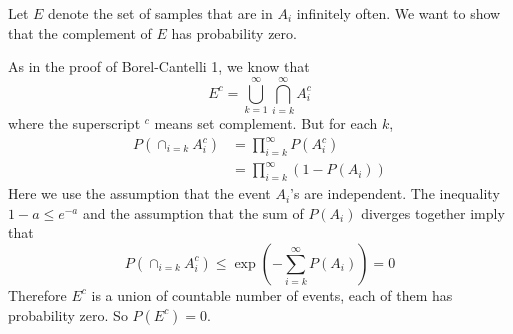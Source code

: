\documentclass[12pt]{article}
\begin{document}
Let $E$ denote the set of samples that are in $A_i$ infinitely often. We want to show that the complement of $E$ has probability zero.

As in the proof of Borel-Cantelli 1, we know that
\[
 E^c = \bigcup_{k=1}^\infty \bigcap_{i=k}^\infty A_i^c
\]
where the superscript $^c$ means set complement. But for each $k$,
\begin{align*}
P(\cap_{i=k} A_i^c) &= \prod_{i=k}^\infty P(A_i^c) \\
&= \prod_{i=k}^\infty (1-P(A_i))
\end{align*}
Here we use the assumption that the event $A_i$'s are independent. The inequality $1-a \leq e^{-a}$ and the assumption that the sum of $P(A_i)$ diverges together imply that
\[
  P(\cap_{i=k} A_i^c) \leq \exp(-\sum_{i=k}^\infty P(A_i)) = 0
\]
Therefore $E^c$ is a union of countable number of events, each of them has probability zero. So $P(E^c)=0$.
\end{document}
